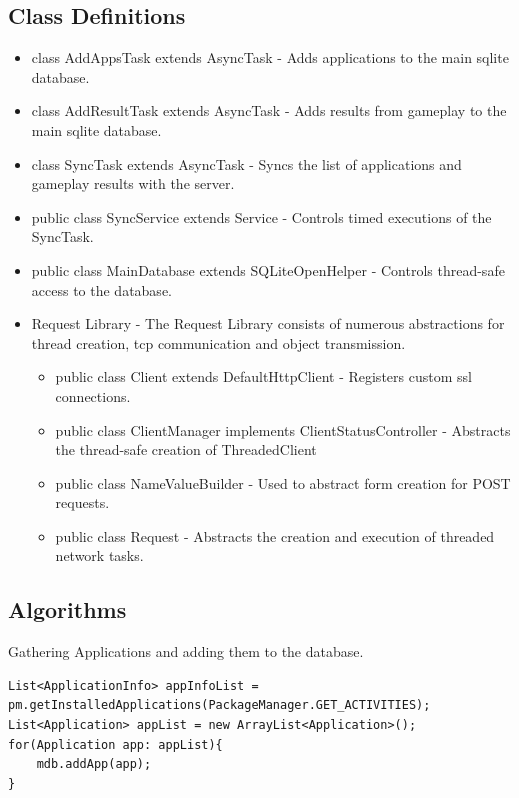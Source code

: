 \documentclass[a4wide]{article}
\begin{document}
\subsection{Class Definitions}
\begin{itemize}
\item class AddAppsTask extends AsyncTask\newline
- Adds applications to the main sqlite database.
\item class AddResultTask extends AsyncTask\newline
- Adds results from gameplay to the main sqlite database.
\item class SyncTask extends AsyncTask\newline
- Syncs the list of applications and gameplay results with the server.
\item public class SyncService extends Service\newline
- Controls timed executions of the SyncTask.
\item public class MainDatabase extends SQLiteOpenHelper\newline
- Controls thread-safe access to the database.
\item Request Library\newline
- The Request Library consists of numerous abstractions for thread creation, tcp communication and object transmission.
\begin{itemize}
\item public class Client extends DefaultHttpClient\newline
- Registers custom ssl connections.
\item public class ClientManager implements ClientStatusController\newline
- Abstracts the thread-safe creation of ThreadedClient
\item public class NameValueBuilder\newline
- Used to abstract form creation for POST requests.
\item public class Request\newline
- Abstracts the creation and execution of threaded network tasks.
\end{itemize}
\end{itemize}


\subsection{Algorithms}
Gathering Applications and adding them to the database.
\begin{lstlisting}
List<ApplicationInfo> appInfoList = pm.getInstalledApplications(PackageManager.GET_ACTIVITIES);
List<Application> appList = new ArrayList<Application>();
for(Application app: appList){
	mdb.addApp(app);
}
\end{lstlisting}
\end{document}

